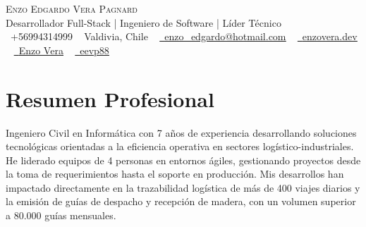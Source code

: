 \documentclass[letterpaper,11pt]{article}
\begin{document}

\begin{center}
    {\Huge \scshape Enzo Edgardo Vera Pagnard} \\ \vspace{1pt}
    Desarrollador Full-Stack | Ingeniero de Software | Líder Técnico\\ \vspace{1pt}
    \small \raisebox{-0.1\height}\faWhatsapp\ +56994314999 ~ 
    Valdivia, Chile ~ 
    \href{mailto:enzo_edgardo@hotmail.com}{\raisebox{-0.2\height}\faEnvelope\ \underline{enzo\_edgardo@hotmail.com}} ~ 
    \href{https://enzovera.dev/}{\raisebox{-0.2\height}\faDesktop\ \underline{enzovera.dev}} ~ 
    \href{https://www.linkedin.com/in/enzoverapagnard/}{\raisebox{-0.2\height}\faLinkedin\ \underline{Enzo Vera}}  ~
    \href{https://github.com/eevp88}{\raisebox{-0.2\height}\faGithub\ \underline{eevp88}}
    \vspace{-8pt}
\end{center}


\section{Resumen Profesional}
Ingeniero Civil en Informática con 7 años de experiencia desarrollando soluciones tecnológicas orientadas a la eficiencia operativa en sectores logístico-industriales.  
He liderado equipos de 4 personas en entornos ágiles, gestionando proyectos desde la toma de requerimientos hasta el soporte en producción. 
Mis desarrollos han impactado directamente en la trazabilidad logística de más de 400 viajes diarios y la emisión de guías de despacho y recepción de madera, con un volumen superior a 80.000 guías mensuales.

\end{document}
